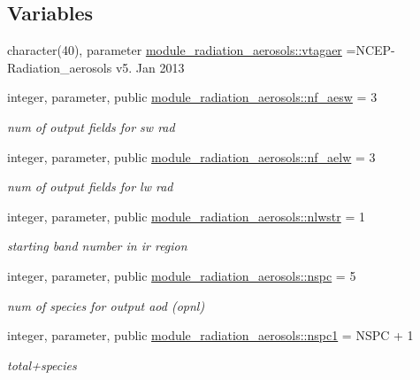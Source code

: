 \subsection*{Variables}
\begin{DoxyCompactItemize}
\item 
character(40), parameter \hyperlink{namespacemodule__radiation__aerosols_a6d0e0cbcb4a13c1f80f6b1c41b13d3b8}{module\+\_\+radiation\+\_\+aerosols\+::vtagaer} =\textquotesingle{}N\+C\+EP-\/Radiation\+\_\+aerosols v5. Jan 2013 \textquotesingle{}
\item 
integer, parameter, public \hyperlink{namespacemodule__radiation__aerosols_ae0d9615fa694e2a5dfe8fb48e99b7e76}{module\+\_\+radiation\+\_\+aerosols\+::nf\+\_\+aesw} = 3
\begin{DoxyCompactList}\small\item\em num of output fields for sw rad \end{DoxyCompactList}\item 
integer, parameter, public \hyperlink{namespacemodule__radiation__aerosols_afba0069cd611248a9595a126a13f5203}{module\+\_\+radiation\+\_\+aerosols\+::nf\+\_\+aelw} = 3
\begin{DoxyCompactList}\small\item\em num of output fields for lw rad \end{DoxyCompactList}\item 
integer, parameter, public \hyperlink{namespacemodule__radiation__aerosols_a654ab60d433133542d3c07edd2244566}{module\+\_\+radiation\+\_\+aerosols\+::nlwstr} = 1
\begin{DoxyCompactList}\small\item\em starting band number in ir region \end{DoxyCompactList}\item 
integer, parameter, public \hyperlink{namespacemodule__radiation__aerosols_a3d126c465af80bb698d9d1a288c181bb}{module\+\_\+radiation\+\_\+aerosols\+::nspc} = 5
\begin{DoxyCompactList}\small\item\em num of species for output aod (opnl) \end{DoxyCompactList}\item 
integer, parameter, public \hyperlink{namespacemodule__radiation__aerosols_a476c0181513603112dec3f4d2a2ec839}{module\+\_\+radiation\+\_\+aerosols\+::nspc1} = N\+S\+PC + 1
\begin{DoxyCompactList}\small\item\em total+species \end{DoxyCompactList}\item 

\end{DoxyCompactItemize}
